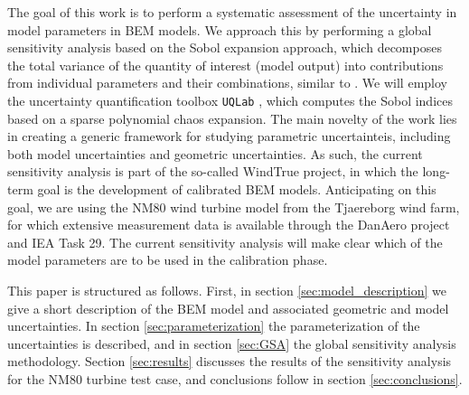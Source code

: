 The goal of this work is to perform a systematic assessment of the uncertainty in model parameters in BEM models. We approach this by performing a global sensitivity analysis based on the Sobol expansion approach, which decomposes the total variance of the quantity of interest (model output) into contributions from individual parameters and their combinations, similar to \cite{Echeverria2017,Murcia2018, Rinker2016a}. We will employ the uncertainty quantification toolbox \texttt{UQLab} \cite{uqlab}, which computes the Sobol indices based on a sparse polynomial chaos expansion. The main novelty of the work lies in creating a generic framework for studying parametric uncertainteis, including both model uncertainties and geometric uncertainties. As such, the current sensitivity analysis is part of the so-called WindTrue project, in which the long-term goal is the development of calibrated BEM models. Anticipating on this goal, we are using the NM80 wind turbine model from the Tjaereborg wind farm, for which extensive measurement data is available through the DanAero project \cite{Troldborg2013} and IEA Task 29. The current sensitivity analysis will make clear which of the model parameters are to be used in the calibration phase.

This paper is structured as follows. First, in section \ref{sec:model_description} we give a short description of the BEM model and associated geometric and model uncertainties. In section \ref{sec:parameterization} the parameterization of the uncertainties is described, and in section \ref{sec:GSA} the global sensitivity analysis methodology. Section \ref{sec:results} discusses the results of the sensitivity analysis for the NM80 turbine test case, and conclusions follow in section \ref{sec:conclusions}.

